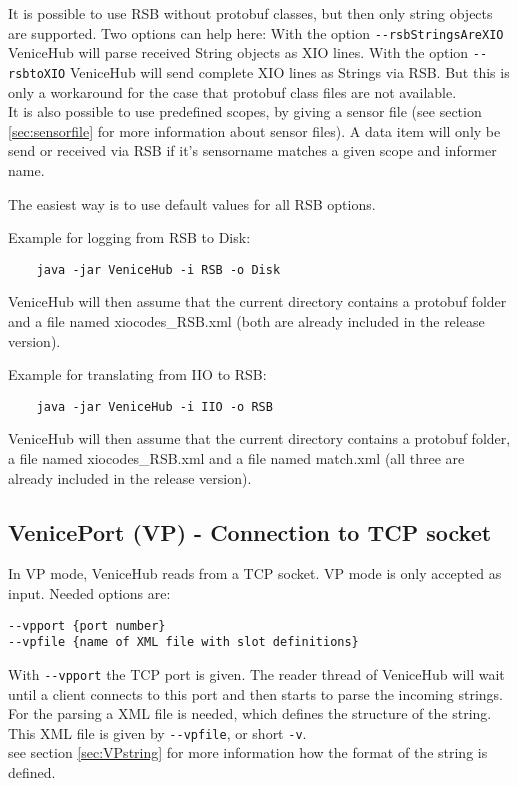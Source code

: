 \documentclass[german,a4paper]{article}
\begin{document}
It is possible to use RSB without protobuf classes, but then only string objects are supported. Two options can help here: With the option \texttt{-\--rsbStringsAreXIO} VeniceHub will parse received String objects as XIO lines. With the option \texttt{-\--rsbtoXIO} VeniceHub will send complete XIO lines as Strings via RSB. But this is only a workaround for the case that protobuf class files are not available.\\

It is also possible to use predefined scopes, by giving a sensor file (see section \ref{sec:sensorfile} for more information about sensor files). A data item will only be send or received via RSB if it's sensorname matches a given scope and informer name.

The easiest way is to use default values for all RSB options.

Example for logging from RSB to Disk:
\begin{lstlisting}
    java -jar VeniceHub -i RSB -o Disk
\end{lstlisting}
VeniceHub will then assume that the current directory contains a protobuf folder and a file named xiocodes\_RSB.xml (both are already included in the release version).

Example for translating from IIO to RSB:
\begin{lstlisting}
    java -jar VeniceHub -i IIO -o RSB
\end{lstlisting}
VeniceHub will then assume that the current directory contains a protobuf folder, a file named xiocodes\_RSB.xml and a file named match.xml (all three are already included in the release version).


\subsection{VenicePort (VP) - Connection to TCP socket}
In VP mode, VeniceHub reads from a TCP socket. VP mode is only accepted as input. Needed options are:
\begin{lstlisting}
--vpport {port number}
--vpfile {name of XML file with slot definitions}
\end{lstlisting}
With \texttt{-\--vpport} the TCP port is given. The reader thread of VeniceHub will wait until a client connects to this port and then starts to parse the incoming strings. For the parsing a XML file is needed, which defines the structure of the string. This XML file is given by \texttt{-\--vpfile}, or short \texttt{-v}.\\
see section \ref{sec:VPstring} for more information how the format of the string is defined.
\end{document}
